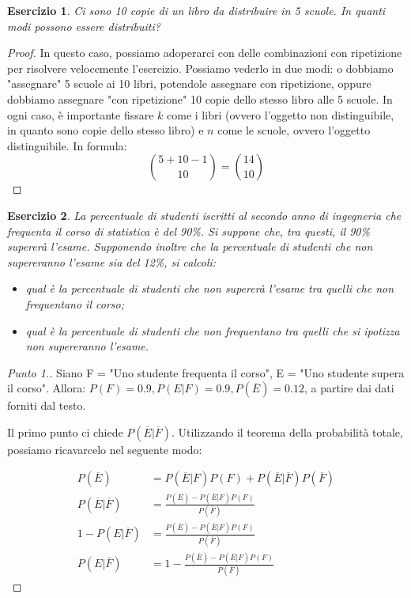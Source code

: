 \documentclass[12pt]{article}
\newtheorem{theorem}{Esercizio}
\renewcommand\qedsymbol{$\square$}
\begin{document}
\begin{theorem}
	Ci sono 10 copie di un libro da distribuire in 5 scuole. In quanti modi possono essere distribuiti?
\end{theorem}

\begin{proof}
	In questo caso, possiamo adoperarci con delle combinazioni con ripetizione per risolvere velocemente l'esercizio. Possiamo vederlo in due modi: o dobbiamo "assegnare" 5 scuole ai 10 libri, potendole assegnare con ripetizione, oppure dobbiamo assegnare "con ripetizione" 10 copie dello stesso libro alle 5 scuole. In ogni caso, è importante fissare $k$ come i libri (ovvero l'oggetto non distinguibile, in quanto sono copie dello stesso libro) e $n$ come le scuole, ovvero l'oggetto distinguibile. In formula:
	\[
		\binom{5 + 10 - 1}{10} = \binom{14}{10}
    \]
\end{proof}

\begin{theorem}
	La percentuale di studenti iscritti al secondo anno di ingegneria che frequenta il corso di statistica è del 90\%. Si suppone che, tra questi, il 90\% supererà l'esame. Supponendo inoltre che la percentuale di studenti che non supereranno l'esame sia del 12\%, si calcoli:
	\begin{itemize}
		\item qual è la percentuale di studenti che non supererà l'esame tra quelli che non frequentano il corso;
		\item qual è la percentuale di studenti che non frequentano tra quelli che si ipotizza non supereranno l'esame.
	\end{itemize}
\end{theorem}

\renewcommand\qedsymbol{$\square$}

\begin{proof}[Punto 1.]
	Siano F = "Uno studente frequenta il corso", E = "Uno studente supera il corso". Allora: $P(F) = 0.9, P(E|F) = 0.9, P(\overline{E}) = 0.12$, a partire dai dati forniti dal testo.
	
	Il primo punto ci chiede $P(\overline{E}|\overline{F})$. Utilizzando il teorema della probabilità totale, possiamo ricavarcelo nel seguente modo:
	
	\begin{equation*}
		\begin{split}
			P(\overline{E}) & = P(\overline{E}|F)P(F) + P(\overline{E}|\overline{F})P(\overline{F}) \\
			P(\overline{E}|\overline{F}) & = \frac{P(\overline{E}) - P(\overline{E}|F)P(F)}{P(\overline{F})} \\
			1 - P(E|\overline{F}) & = \frac{P(\overline{E}) - P(\overline{E}|F)P(F)}{P(\overline{F})} \\
			P(E|\overline{F}) & = 1 - \frac{P(\overline{E}) - P(\overline{E}|F)P(F)}{P(\overline{F})}
		\end{split}
	\end{equation*}
\end{proof}
\end{document}
